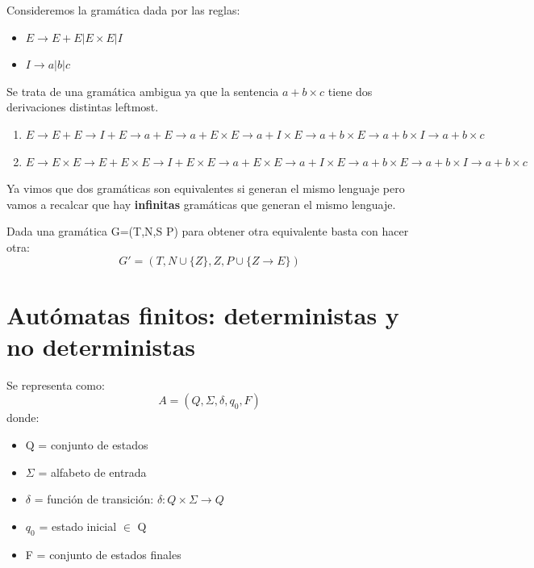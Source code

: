 \documentclass{apuntes}
\begin{document}
\begin{example}
Consideremos la gramática dada por las reglas:
\begin{itemize}
\item $E \rightarrow E + E | E \times E | I$
\item $I \rightarrow a | b | c$
\end{itemize}

Se trata de una gramática ambigua ya que la sentencia $a+b\times c$ tiene dos derivaciones distintas leftmost.
\begin{enumerate}
\item $E \rightarrow E + E \rightarrow I + E \rightarrow a + E \rightarrow a + E \times E \rightarrow a + I \times E \rightarrow a + b \times E \rightarrow a + b \times I \rightarrow a + b \times c$
\item $E \rightarrow E \times E \rightarrow E + E \times E \rightarrow I + E \times E \rightarrow a + E \times E \rightarrow a + I \times E \rightarrow a+b \times E \rightarrow a + b \times I \rightarrow a + b \times c$
\end{enumerate}
\end{example}

Ya vimos que dos gramáticas son equivalentes si generan el mismo lenguaje pero vamos a recalcar que hay \textbf{infinitas} gramáticas que generan el mismo lenguaje. 

Dada una gramática G=(T,N,S P) para obtener otra equivalente basta con hacer otra:
\[G' =(T, N \cup \lbrace Z \rbrace, Z, P \cup \lbrace Z \rightarrow E \rbrace)\]

\newpage

\chapter{Autómatas finitos: deterministas y no deterministas}
\begin{defn}[Autómata]
Se representa como:
\[ A=(Q, \Sigma, \delta, q_0, F)\]
 donde:
\begin{itemize}
\item Q = conjunto de estados
\item $\Sigma$ =  alfabeto de entrada
\item $\delta$ = función de transición: $\delta : Q\times \Sigma \rightarrow Q$
\item $q_0$ = estado inicial $\in$ Q
\item F = conjunto de estados finales
\end{itemize}
\end{defn}
\end{document}
